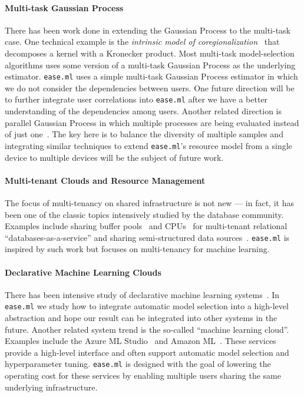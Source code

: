 \documentclass[letterpaper]{vldb}
\newcommand{\eml}{\texttt{ease.ml}\xspace}
\begin{document}
\vspace{-1em}
\paragraph*{Multi-task Gaussian Process}
There has been work done in extending the Gaussian Process to the 
multi-task case. One technical example is the {\em intrinsic model
of coregionalization}~\cite{XXX} that decomposes
a kernel with a Kronecker product. Most 
multi-task model-selection algorithms uses some version of
a multi-task Gaussian Process as the underlying estimator.
\eml uses a simple multi-task Gaussian Process estimator in which we
do not consider the dependencies between users. One 
future direction will be to further integrate user correlations 
into \eml after we have a better understanding of the dependencies
 among users.
Another related direction is parallel Gaussian Process in which multiple
processes are being evaluated instead of just one~\cite{XXX}.
The key here is to balance the diversity of multiple samples
and integrating similar techniques
to extend \eml's resource model from a single device to multiple devices will be the subject of future work.

\vspace{-1em}
\paragraph*{Multi-tenant Clouds and Resource Management}
The focus of multi-tenancy on shared infrastructure is not new ---
in fact, it has been one of the classic topics intensively
studied by the database community. Examples include
sharing buffer pools~\cite{XXX} and CPUs~\cite{XXX}
for multi-tenant relational ``databases-as-a-service''
and sharing semi-structured data sources~\cite{XXX}.
\eml is inspired by such work but focuses on
multi-tenancy for machine learning.

\vspace{-1em}
\paragraph*{Declarative Machine Learning Clouds} 
There has been intensive study of declarative
machine learning systems~\cite{XXX,XXX,XXX,XXX,XXX,XXX}. In \eml we 
study how to integrate automatic model selection into
a high-level abstraction and hope our result can be integrated
into other systems in the future.
Another related system trend is the so-called ``machine learning
cloud''. Examples include the Azure ML Studio~\cite{XXX}
and Amazon ML~\cite{XXX}. These services
provide a high-level interface and often support automatic model selection
and hyperparameter tuning. \eml is designed with the goal of
lowering the operating cost for these services 
by enabling multiple users sharing the same underlying 
infrastructure.
\end{document}
